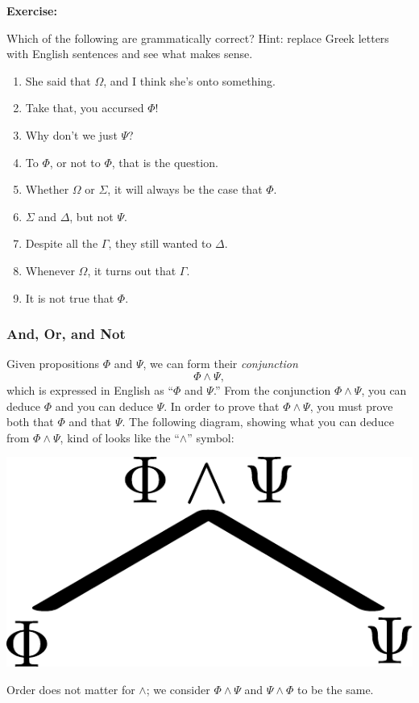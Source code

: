 \documentclass[12pt]{article}
\newcommand{\AND}{\wedge}
\newcommand{\ex}[1]{\textbf{Exercise:}\begin{adjustwidth}{2em}{}#1\end{adjustwidth}}
\def\pA{\Phi}
\def\pB{\Psi}
\def\pC{\Omega}
\def\pD{\Sigma}
\def\pE{\Gamma}
\def\pF{\Delta}
\begin{document}
\ex{
Which of the following are grammatically correct? Hint: replace Greek letters with English sentences and see what makes sense.
\begin{enumerate}
\item She said that $\pC$, and I think she's onto something.
\item Take that, you accursed $\pA$!
\item Why don't we just $\pB$?
\item To $\pA$, or not to $\pA$, that is the question.
\item Whether $\pC$ or $\pD$, it will always be the case that $\pA$.
\item $\pD$ and $\pF$, but not $\pB$.
\item Despite all the $\pE$, they still wanted to $\pF$.
\item Whenever $\pC$, it turns out that $\pE$.
\item It is not true that $\pA$.
\end{enumerate}
}



\subsubsection{And, Or, and Not}

Given propositions $\pA$ and $\pB$, we can form their \emph{conjunction}
$$
\pA \AND \pB,
$$
which is expressed in English as ``$\pA$ and $\pB$.''
From the conjunction $\pA\AND\pB$, you can deduce $\pA$ and you can deduce $\pB$.
In order to prove that $\pA\AND\pB$, you must prove both that $\pA$ and that $\pB$.
The following diagram, showing what you can deduce from $\pA\AND\pB$, kind of looks like the ``$\AND$'' symbol:
\begin{center}\includegraphics[scale=0.5]{andDiagram.pdf}\end{center}
Order does not matter for $\AND$; we consider $\pA\AND\pB$ and $\pB\AND\pA$ to be the same.
\end{document}
